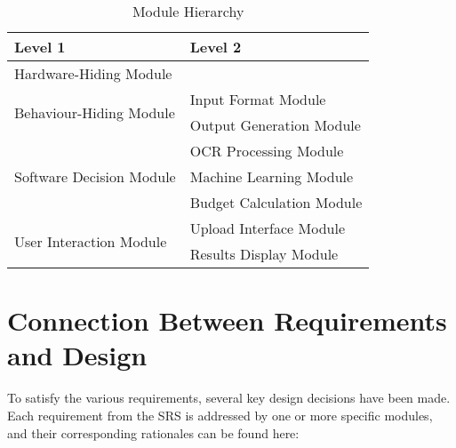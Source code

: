 \documentclass[12pt, titlepage]{article}
\begin{document}
\begin{table}[h!]
\centering
\begin{tabular}{p{} p{}}
\toprule
\textbf{Level 1} & \textbf{Level 2}\\
\midrule

{Hardware-Hiding Module} & ~ \\
\midrule

\multirow{2}{0.3\textwidth}{Behaviour-Hiding Module} & Input Format Module\\
& Output Generation Module\\
\midrule

\multirow{3}{0.3\textwidth}{Software Decision Module} & {OCR Processing Module}\\
& Machine Learning Module\\
& Budget Calculation Module\\
\midrule

\multirow{2}{0.3\textwidth}{User Interaction Module} & {Upload Interface Module}\\
& Results Display Module\\
\bottomrule

\end{tabular}
\caption{Module Hierarchy}
\label{TblMH}
\end{table}

\section{Connection Between Requirements and Design} \label{SecConnection}



To satisfy the various requirements, several key design decisions have been made. Each requirement from the SRS is addressed by one or more specific modules, and their corresponding rationales can be found here: \\
\end{document}
